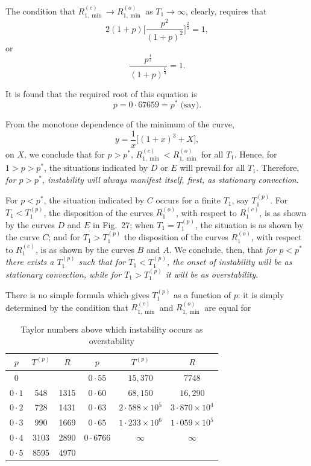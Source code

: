 The condition that $R_{1,\min}^{(c)} \to R_{1,\min}^{(o)}$ as $T_1 \to \infty$, clearly, requires that
\begin{equation}\label{eq:3-231}
2(1+p)\bigg[\frac{p^2}{(1+p)^2}\bigg]^{\frac{2}{3}} = 1,
\end{equation}
or
\begin{equation}\label{eq:3-232}
\frac{p^{\frac{4}{3}}}{(1+p)^{\frac{1}{3}}} = 1.
\end{equation}

It is found that the required root of this equation is
\begin{equation}\label{eq:3-233}
p = 0{\cdot}67659 = p^* \;\text{(say)}.
\end{equation}

From the monotone dependence of the minimum of the curve,
\begin{equation}\label{eq:3-234a}
y = \frac{1}{x}\big[(1+x)^3 + X\big],
\end{equation}
on $X$, we conclude that for $p > p^*$, $R_{1,\min}^{(c)} < R_{1,\min}^{(o)}$ for all $T_1$. Hence, for $1 > p > p^*$, the situations indicated by $D$ or $E$ will prevail for all $T_1$. Therefore, \emph{for $p > p^*$, instability will always manifest itself, first, as stationary convection}.

For $p < p^*$, the situation indicated by $C$ occurs for a finite $T_1$, say $T_1^{(p)}$. For $T_1 < T_1^{(p)}$, the disposition of the curves $R_1^{(o)}$, with respect to $R_1^{(c)}$, is as shown by the curves $D$ and $E$ in Fig.~27; when $T_1 = T_1^{(p)}$, the situation is as shown by the curve $C$; and for $T_1 > T_1^{(p)}$ the disposition of the curves $R_1^{(o)}$, with respect to $R_1^{(c)}$, is as shown by the curves $B$ and $A$. We conclude, then, that \emph{for $p < p^*$ there exists a $T_1^{(p)}$ such that for $T_1 < T_1^{(p)}$, the onset of instability will be as stationary convection, while for $T_1 > T_1^{(p)}$ it will be as overstability}.

There is no simple formula which gives $T_1^{(p)}$ as a function of $p$: it is simply determined by the condition that $R_{1,\min}^{(c)}$ and $R_{1,\min}^{(o)}$ are equal for

\begin{table}[ht]
\centering
\caption{Taylor numbers above which instability occurs as overstability}
\label{tab:X}
\begin{tabular}{cccccc}
\hline
$p$ & $T^{(p)}$ & $R$ & $p$ & $T^{(p)}$ & $R$ \\
\hline
$0$ & & & $0{\cdot}55$ & $15{,}370$ & 7748 \\
$0{\cdot}1$ & 548 & 1315 & $0{\cdot}60$ & $68{,}150$ & $16{,}290$ \\
$0{\cdot}2$ & 728 & 1431 & $0{\cdot}63$ & $2{\cdot}588\times 10^5$ & $3{\cdot}870\times 10^4$ \\
$0{\cdot}3$ & 990 & 1669 & $0{\cdot}65$ & $1{\cdot}233\times 10^6$ & $1{\cdot}059\times 10^5$ \\
$0{\cdot}4$ & 3103 & 2890 & $0{\cdot}6766$ & $\infty$ & $\infty$ \\
$0{\cdot}5$ & 8595 & 4970 & & & \\
\hline
\end{tabular}
\end{table}

